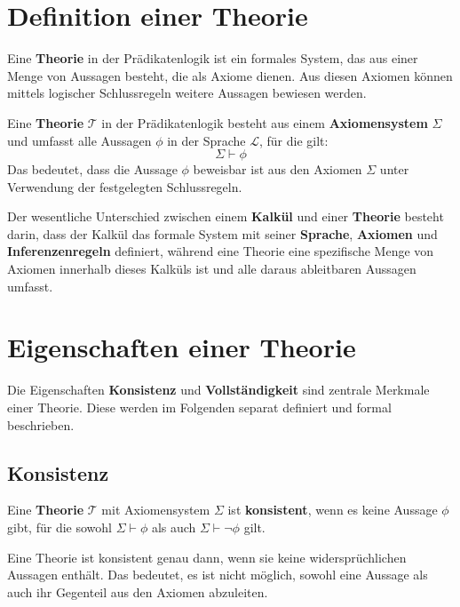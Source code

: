 \documentclass[main.tex]{subfiles}
\begin{document}
\section{Definition einer Theorie}

Eine \textbf{Theorie} in der Prädikatenlogik ist ein formales System, das aus einer Menge von Aussagen besteht, die als Axiome dienen. Aus diesen Axiomen können mittels logischer Schlussregeln weitere Aussagen bewiesen werden.

\begin{definition}[Theorie]
Eine \textbf{Theorie} \(\mathcal{T}\) in der Prädikatenlogik besteht aus einem \textbf{Axiomensystem} \(\Sigma\) und umfasst alle Aussagen \(\phi\) in der Sprache \(\mathcal{L}\), für die gilt:
\[
\Sigma \vdash \phi
\]
Das bedeutet, dass die Aussage \(\phi\) beweisbar ist aus den Axiomen \(\Sigma\) unter Verwendung der festgelegten Schlussregeln.
\end{definition}

\begin{remark}
Der wesentliche Unterschied zwischen einem \textbf{Kalkül} und einer \textbf{Theorie} besteht darin, dass der Kalkül das formale System mit seiner \textbf{Sprache}, \textbf{Axiomen} und \textbf{Inferenzenregeln} definiert, während eine Theorie eine spezifische Menge von Axiomen innerhalb dieses Kalküls ist und alle daraus ableitbaren Aussagen umfasst.
\end{remark}

\section{Eigenschaften einer Theorie}

Die Eigenschaften \textbf{Konsistenz} und \textbf{Vollständigkeit} sind zentrale Merkmale einer Theorie. Diese werden im Folgenden separat definiert und formal beschrieben.

\subsection{Konsistenz}

\begin{definition}[Konsistenz]
Eine \textbf{Theorie} \(\mathcal{T}\) mit Axiomensystem \(\Sigma\) ist \textbf{konsistent}, wenn es keine Aussage \(\phi\) gibt, für die sowohl \(\Sigma \vdash \phi\) als auch \(\Sigma \vdash \neg \phi\) gilt.
\end{definition}

\begin{remark}
Eine Theorie ist konsistent genau dann, wenn sie keine widersprüchlichen Aussagen enthält. Das bedeutet, es ist nicht möglich, sowohl eine Aussage als auch ihr Gegenteil aus den Axiomen abzuleiten.
\end{remark}
\end{document}
